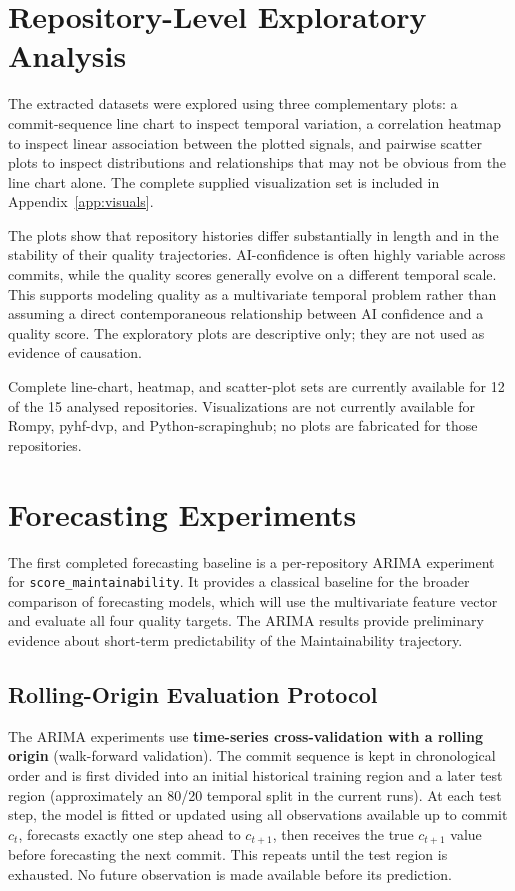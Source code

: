 \documentclass[12pt,a4paper,oneside]{report}
\newcommand{\code}[1]{\nolinkurl{#1}}
\begin{document}
\section{Repository-Level Exploratory Analysis}
The extracted datasets were explored using three complementary plots: a commit-sequence line chart to inspect temporal variation, a correlation heatmap to inspect linear association between the plotted signals, and pairwise scatter plots to inspect distributions and relationships that may not be obvious from the line chart alone. The complete supplied visualization set is included in Appendix~\ref{app:visuals}.

The plots show that repository histories differ substantially in length and in the stability of their quality trajectories. AI-confidence is often highly variable across commits, while the quality scores generally evolve on a different temporal scale. This supports modeling quality as a multivariate temporal problem rather than assuming a direct contemporaneous relationship between AI confidence and a quality score. The exploratory plots are descriptive only; they are not used as evidence of causation.

Complete line-chart, heatmap, and scatter-plot sets are currently available for 12 of the 15 analysed repositories. Visualizations are not currently available for Rompy, pyhf-dvp, and Python-scrapinghub; no plots are fabricated for those repositories.

\section{Forecasting Experiments}
\label{sec:forecasting-experiments}
The first completed forecasting baseline is a per-repository ARIMA experiment for \code{score\_maintainability}. It provides a classical baseline for the broader comparison of forecasting models, which will use the multivariate feature vector and evaluate all four quality targets. The ARIMA results provide preliminary evidence about short-term predictability of the Maintainability trajectory.

\subsection{Rolling-Origin Evaluation Protocol}
The ARIMA experiments use \textbf{time-series cross-validation with a rolling origin} (walk-forward validation). The commit sequence is kept in chronological order and is first divided into an initial historical training region and a later test region (approximately an 80/20 temporal split in the current runs). At each test step, the model is fitted or updated using all observations available up to commit $c_t$, forecasts exactly one step ahead to $c_{t+1}$, then receives the true $c_{t+1}$ value before forecasting the next commit. This repeats until the test region is exhausted. No future observation is made available before its prediction.
\end{document}
